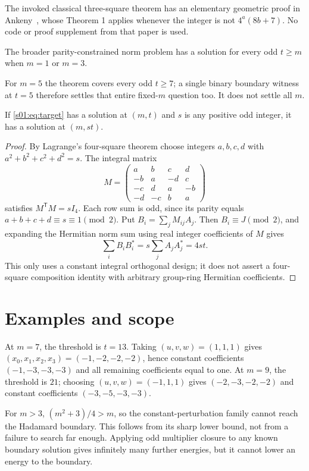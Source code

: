 The invoked classical three-square theorem has an elementary geometric
proof in Ankeny~\cite{s01:Ankeny}, whose Theorem 1 applies whenever the
integer is not $4^a(8b+7)$. No code or proof supplement from that paper
is used.

\begin{corollary}
The broader parity-constrained norm problem has a solution for every
odd $t\ge m$ when $m=1$ or $m=3$.
\end{corollary}
For $m=5$ the theorem covers every odd $t\ge7$; a single binary boundary
witness at $t=5$ therefore settles that entire fixed-$m$ question too.
It does not settle all $m$.

\begin{proposition}\label{s01:prop:multiplier}
If \eqref{s01:eq:target} has a solution at $(m,t)$ and $s$ is any positive
odd integer, it has a solution at $(m,st)$.
\end{proposition}
\begin{proof}
By Lagrange's four-square theorem choose integers $a,b,c,d$ with
$a^2+b^2+c^2+d^2=s$. The integral matrix
\[
 M=\begin{pmatrix}
 a&b&c&d\\-b&a&-d&c\\-c&d&a&-b\\-d&-c&b&a
 \end{pmatrix}
\]
satisfies $M^{\mathsf T}M=sI_4$. Each row sum is odd, since its parity
equals $a+b+c+d\equiv s\equiv1\pmod2$.
Put $B_i=\sum_jM_{ij}A_j$. Then $B_i\equiv J\pmod2$, and expanding
the Hermitian norm sum using real integer coefficients of $M$ gives
\[
 \sum_i B_iB_i^*=s\sum_jA_jA_j^*=4st.
\]
This only uses a constant integral orthogonal design; it does not
assert a four-square composition identity with arbitrary group-ring
Hermitian coefficients.
\end{proof}

\section*{Examples and scope}
At $m=7$, the threshold is $t=13$. Taking $(u,v,w)=(1,1,1)$ gives
$(x_0,x_1,x_2,x_3)=(-1,-2,-2,-2)$, hence constant coefficients
$(-1,-3,-3,-3)$ and all remaining coefficients equal to one.
At $m=9$, the threshold is $21$; choosing $(u,v,w)=(-1,1,1)$ gives
$(-2,-3,-2,-2)$ and constant coefficients $(-3,-5,-3,-3)$.

For $m>3$, $(m^2+3)/4>m$, so the constant-perturbation family cannot
reach the Hadamard boundary. This follows from its sharp lower bound,
not from a failure to search far enough. Applying odd multiplier closure
to any known boundary solution gives infinitely many further energies,
but it cannot lower an energy to the boundary.

